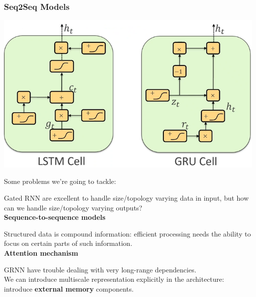 \documentclass[10pt]{report}
\begin{document}
\subsubsection{Seq2Seq Models}
\begin{center}
	\includegraphics[scale=0.5]{106.png}
\end{center}
Some problems we're going to tackle:
\begin{list}{}{}
	\item Gated RNN are excellent to handle size/topology varying data in input, but how can we handle size/topology varying outputs?\\
	\textbf{Sequence-to-sequence models}
	\item Structured data is compound information: efficient processing needs the ability to focus on certain parts of such information.\\
	\textbf{Attention mechanism}
	\item GRNN have trouble dealing with very long-range dependencies.\\
	We can introduce multiscale representation explicitly in the architecture: introduce \textbf{external memory} components.
\end{list}
\end{document}

